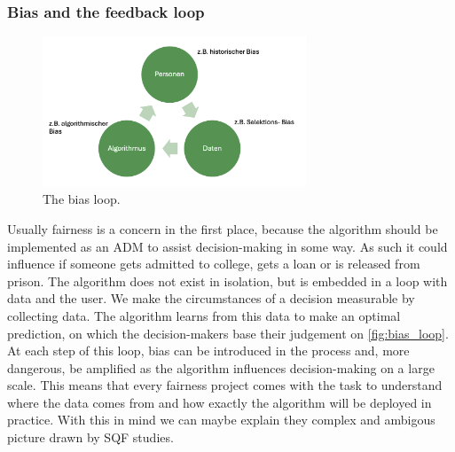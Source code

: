 \subsubsection*{Bias and the feedback loop}
\begin{figure}
    \centering
    \includegraphics[width=0.7\textwidth]{../figures/bias_loop.png}
    \caption{The bias loop.}
    \label{fig:bias_loop}
\end{figure}

Usually fairness is a concern in the first place, because the algorithm should be implemented as an ADM to assist decision-making in some way. As such it could influence if someone gets admitted to college, gets a loan or is released from prison. The algorithm does not exist in isolation, but is embedded in a loop with data and the user.
We make the circumstances of a decision measurable by collecting data. The algorithm learns from this data to make an optimal prediction, on which the decision-makers base their judgement on \autoref{fig:bias_loop}. At each step of this loop, bias can be introduced in the process and, more dangerous, be amplified as the algorithm influences decision-making on a large scale.
This means that every fairness project comes with the task to understand where the data comes from and how exactly the algorithm will be deployed in practice. With this in mind we can maybe explain they complex and ambigous picture drawn by SQF studies.

